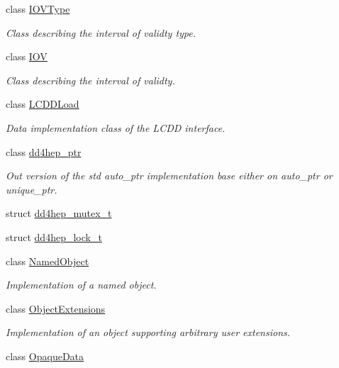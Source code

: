 \begin{DoxyCompactItemize}
class \hyperlink{class_d_d4hep_1_1_i_o_v_type}{IOVType}
\begin{DoxyCompactList}\small\item\em Class describing the interval of validty type. \item\end{DoxyCompactList}\item 
class \hyperlink{class_d_d4hep_1_1_i_o_v}{IOV}
\begin{DoxyCompactList}\small\item\em Class describing the interval of validty. \item\end{DoxyCompactList}\item 
class \hyperlink{class_d_d4hep_1_1_l_c_d_d_load}{LCDDLoad}
\begin{DoxyCompactList}\small\item\em Data implementation class of the LCDD interface. \item\end{DoxyCompactList}\item 
class \hyperlink{class_d_d4hep_1_1dd4hep__ptr}{dd4hep\_\-ptr}
\begin{DoxyCompactList}\small\item\em Out version of the std auto\_\-ptr implementation base either on auto\_\-ptr or unique\_\-ptr. \item\end{DoxyCompactList}\item 
struct \hyperlink{struct_d_d4hep_1_1dd4hep__mutex__t}{dd4hep\_\-mutex\_\-t}
\item 
struct \hyperlink{struct_d_d4hep_1_1dd4hep__lock__t}{dd4hep\_\-lock\_\-t}
\item 
class \hyperlink{class_d_d4hep_1_1_named_object}{NamedObject}
\begin{DoxyCompactList}\small\item\em Implementation of a named object. \item\end{DoxyCompactList}\item 
class \hyperlink{class_d_d4hep_1_1_object_extensions}{ObjectExtensions}
\begin{DoxyCompactList}\small\item\em Implementation of an object supporting arbitrary user extensions. \item\end{DoxyCompactList}\item 
class \hyperlink{class_d_d4hep_1_1_opaque_data}{OpaqueData}

\end{DoxyCompactItemize}
